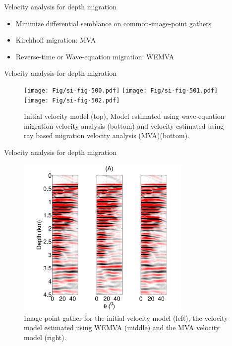 \documentclass[xcolor=dvipsnames,notes]{beamer}
\begin{document}
\begin{frame}{Velocity analysis for depth migration}
\begin{itemize}
  \item Minimize differential semblance on common-image-point gathers
  \item Kirchhoff migration: MVA
  \item Reverse-time or Wave-equation migration: WEMVA
\end{itemize}
\end{frame}
%
\begin{frame}{Velocity analysis for depth migration}
\begin{figure}
\texttt{[image: Fig/si-fig-500.pdf]}
\texttt{[image: Fig/si-fig-501.pdf]}
\texttt{[image: Fig/si-fig-502.pdf]}
\caption{Initial velocity model (top), Model estimated using wave-equation migration 
         velocity analysis (bottom) and velocity estimated using ray based migration
         velocity analysis (MVA)(bottom).}
\label{fig:si-fig-301}
\end{figure}
\end{frame}
%
%
\begin{frame}{Velocity analysis for depth migration}
\begin{figure}
\includegraphics[width=0.75\textwidth]{Fig/si-fig-503.pdf}
\caption{Image point gather for the initial velocity model (left), 
         the velocity model estimated using WEMVA (middle) and the MVA velocity model (right).}
\label{fig:si-fig-302}
\end{figure}
\end{frame}
\end{document}
